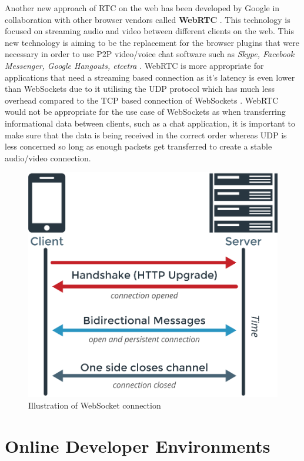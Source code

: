 Another new approach of RTC on the web has been developed by Google in collaboration with other browser vendors called \textbf{WebRTC} \cite{webrtc}. This technology is focused on streaming audio and video between different clients on the web. This new technology is aiming to be the replacement for the browser plugins that were necessary in order to use P2P video/voice chat software such as \textit{Skype, Facebook Messenger, Google Hangouts, etcetra} \cite{webrtc}. WebRTC is more appropriate for applications that need a streaming based connection as it's latency is even lower than WebSockets due to it utilising the UDP protocol which has much less overhead compared to the TCP based connection of WebSockets \cite{udpvstcp}. WebRTC would not be appropriate for the use case of WebSockets as when transferring informational data between clients, such as a chat application, it is important to make sure that the data is being received in the correct order whereas UDP is less concerned so long as enough packets get transferred to create a stable audio/video connection.

\begin{figure}[h!]
    \centering
    \includegraphics[scale=0.3]{res/WebSockets-Diagram.png}
    \caption{Illustration of WebSocket connection \cite{websocket-img}}
    \label{}
\end{figure}

\section{Online Developer Environments} \label{lit-ode}

